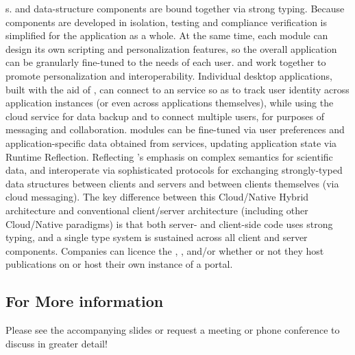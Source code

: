 \documentclass[10pt,letterpaper]{article}
\begin{document}
{\GUI}s.  {\GUI} and data-structure components are 
bound together via strong typing.  Because {\VersatileUX} 
components are developed in isolation, testing and 
compliance verification is simplified for the application 
as a whole.  At the same time, each {\VersatileUX} 
module can design its own scripting and personalization 
features, so the overall application can be 
granularly fine-tuned to the needs of each user.
\p{}
{\NDPCloud} and {\VersatileUX} work together to 
promote personalization and interoperability.  
Individual desktop applications, built 
with the aid of {\VersatileUX}, can connect to an 
{\NDPCloud} service so as to track user identity across 
application instances (or even across applications themselves), 
while using the cloud service for data backup and 
to connect multiple users, for purposes of 
messaging and collaboration.  
{\VersatileUX} modules can be fine-tuned via 
user preferences and application-specific data obtained from 
{\NDPCloud} services, updating application state via 
Runtime Reflection.  Reflecting {\MOSAIC}'s 
emphasis on complex semantics for scientific data, 
{\NDPCloud} and {\VersatileUX} interoperate via 
sophisticated protocols for exchanging 
strongly-typed data structures between clients and 
servers and between clients themselves (via cloud messaging).  
The key difference between this Cloud/Native Hybrid 
architecture and conventional client/server architecture 
(including other Cloud/Native paradigms) is that 
both server- and client-side code uses 
strong typing, and a single type system is 
sustained across all client and server components.
\p{}
Companies can licence the {\MOSAIC} {\SDK}, {\VersatileUX}, and/or 
{\NDPCloud} whether or not they 
host publications on {\MOSAIC} or host their own instance 
of a {\MOSAIC} portal.

\subsection{For More information}
Please see the accompanying slides or request a meeting 
or phone conference to discuss {\MOSAIC} in greater detail!
\end{document}
